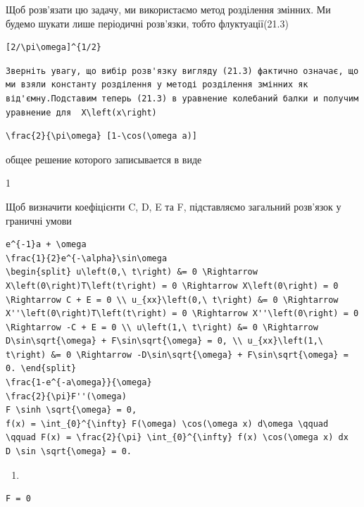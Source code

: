 \documentclass[
  ukrainian,
]{article}
\providecommand{\tightlist}{%
  \setlength{\itemsep}{0pt}\setlength{\parskip}{0pt}}
\begin{document}
Щоб розв'язати цю задачу, ми використаємо метод розділення змінних. Ми
будемо шукати лише періодичні розв'язки, тобто флуктуації(21.3)

\begin{verbatim}
[2/\pi\omega]^{1/2}
\end{verbatim}

\begin{verbatim}
Зверніть увагу, що вибір розв'язку вигляду (21.3) фактично означає, що ми взяли константу розділення у методі розділення змінних як від'ємну.Подставим теперь (21.3) в уравнение колебаний балки и получим уравнение для  X\left(x\right)
\end{verbatim}

\begin{verbatim}
\frac{2}{\pi\omega} [1-\cos(\omega a)]
\end{verbatim}

общее решение которого записывается в виде

1

Щоб визначити коефіцієнти C, D, E та F, підставляємо загальний розв'язок
у граничні умови

\begin{verbatim}
e^{-1}a + \omega
\frac{1}{2}e^{-\alpha}\sin\omega
\begin{split} u\left(0,\ t\right) &= 0 \Rightarrow X\left(0\right)T\left(t\right) = 0 \Rightarrow X\left(0\right) = 0 \Rightarrow C + E = 0 \\ u_{xx}\left(0,\ t\right) &= 0 \Rightarrow X''\left(0\right)T\left(t\right) = 0 \Rightarrow X''\left(0\right) = 0 \Rightarrow -C + E = 0 \\ u\left(1,\ t\right) &= 0 \Rightarrow D\sin\sqrt{\omega} + F\sin\sqrt{\omega} = 0, \\ u_{xx}\left(1,\ t\right) &= 0 \Rightarrow -D\sin\sqrt{\omega} + F\sin\sqrt{\omega} = 0. \end{split}
\frac{1-e^{-a\omega}}{\omega}
\frac{2}{\pi}F''(\omega)
F \sinh \sqrt{\omega} = 0,
f(x) = \int_{0}^{\infty} F(\omega) \cos(\omega x) d\omega \qquad \qquad F(x) = \frac{2}{\pi} \int_{0}^{\infty} f(x) \cos(\omega x) dx
D \sin \sqrt{\omega} = 0.
\end{verbatim}

\begin{enumerate}
\def\labelenumi{\arabic{enumi}.}
\tightlist
\item
\end{enumerate}

\begin{verbatim}
F = 0
\end{verbatim}
\end{document}
